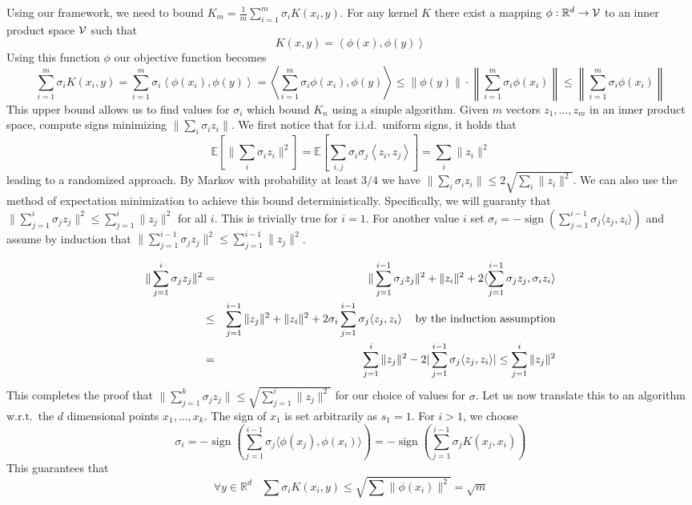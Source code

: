 \documentclass{article} %
\newcommand{\ip}[1]{\left \langle #1 \right \rangle}
\newcommand{\R}{\mathbb{R}}
\newcommand{\E}{\mathbb{E}}
\begin{document}
Using our framework, we need to bound $K_m = \frac{1}{m}\sum_{i=1}^m \sigma_i K(x_i,y)$. For any kernel $K$ there exist a mapping $\phi: \R^d \to {\cal V}$ to an inner product space $\cal V$ such that 
$$ K(x,y) = \ip{\phi(x), \phi(y)} $$
Using this function $\phi$ our objective function becomes
$$\sum_{i=1}^m \sigma_i K(x_i,y) = \sum_{i=1}^m \sigma_i \ip{\phi(x_i), \phi(y)} =  \ip{ \sum_{i=1}^m \sigma_i \phi(x_i), \phi(y)} \leq \|\phi(y)\| \cdot \left\|  \sum_{i=1}^m \sigma_i \phi(x_i) \right\| \leq  \left\|  \sum_{i=1}^m \sigma_i \phi(x_i) \right\| $$
This upper bound allows us to find values for $\sigma_i$ which bound $K_n$ using a simple algorithm.
Given $m$ vectors $z_1,\ldots,z_m$ in an inner product space, compute signs minimizing $\| \sum_i \sigma_i z_i \|$.
We first notice that for i.i.d.\ uniform signs, it holds that
$$\E[\| \sum_i \sigma_i z_i \|^2] = \E[\sum_{i,j} \sigma_i \sigma_j \ip{z_i, z_j}] = \sum_i \|z_i\|^2 $$
leading to a randomized approach. By Markov with probability at least $3/4$ we have $\| \sum_i \sigma_i z_i \| \le 2\sqrt{\sum_i \|z_i\|^2}$.
%
We can also use the method of expectation minimization to achieve this bound deterministically.
Specifically, we will guaranty that $\| \sum_{j=1}^i \sigma_j z_j \|^2 \le \sum_{j=1}^i \|z_j\|^2$ for all $i$.
This is trivially true for $i=1$. 
For another value $i$ set $\sigma_i = -\operatorname{sign} (\sum_{j=1}^{i-1}\sigma_j \langle z_j, z_i \rangle)$ 
and  assume by induction that $\| \sum_{j=1}^{i-1} \sigma_j z_j\|^2 \le \sum_{j=1}^{i-1} \|z_j\|^2$.

\begin{eqnarray*}
\| \sum_{j=1}^{i}\sigma_j z_j\|^2 &=& \|\sum_{j=1}^{i-1}\sigma_j z_j\|^2 + \|z_i\|^2 + 2\langle \sum_{j=1}^{i-1}\sigma_j z_j, \sigma_i z_i\rangle \\
&\le& \sum_{j=1}^{i-1} \|z_j\|^2 + \|z_i\|^2 + 2\sigma_i \sum_{j=1}^{i-1}\sigma_j \langle  z_j,  z_i\rangle \mbox{\;\;\; by the induction assumption}\\ 
&=& \sum_{j=1}^{i} \|z_j\|^2 - 2|\sum_{j=1}^{i-1}\sigma_j \langle  z_j,  z_i\rangle| \le \sum_{j=1}^{i} \|z_j\|^2
\end{eqnarray*}
This completes the proof that $\| \sum_{j=1}^{k}\sigma_j z_j\| \le \sqrt{\sum_{j=1}^{i} \|z_j\|^2}$ for our choice of values for $\sigma$. 
%
Let us now translate this to an algorithm w.r.t.\ the $d$ dimensional points $x_1,\ldots, x_k$. 
The sign of $x_1$ is set arbitrarily as $s_1=1$. For $i>1$, we choose 
$$ \sigma_i = -\operatorname{sign} (\sum_{j=1}^{i-1}\sigma_j \langle \phi(x_j), \phi(x_i) \rangle) = -\operatorname{sign} (\sum_{j=1}^{i-1}\sigma_j  K(x_j, x_i))$$
This guarantees that 
$$ \forall y \in \R^d \;\;\; \sum \sigma_i K(x_i, y) \leq \sqrt{ \sum \|\phi(x_i)\|^2 } = \sqrt{m} $$
\end{document}
